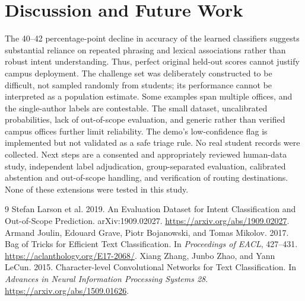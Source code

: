 \documentclass[sigconf,anonymous]{acmart}
\begin{document}
\section{Discussion and Future Work}
The 40--42 percentage-point decline in accuracy of the learned classifiers suggests substantial reliance on repeated phrasing and lexical associations rather than robust intent understanding. Thus, perfect original held-out scores cannot justify campus deployment. The challenge set was deliberately constructed to be difficult, not sampled randomly from students; its performance cannot be interpreted as a population estimate. Some examples span multiple offices, and the single-author labels are contestable. The small dataset, uncalibrated probabilities, lack of out-of-scope evaluation, and generic rather than verified campus offices further limit reliability. The demo's low-confidence flag is implemented but not validated as a safe triage rule. No real student records were collected. Next steps are a consented and appropriately reviewed human-data study, independent label adjudication, group-separated evaluation, calibrated abstention and out-of-scope handling, and verification of routing destinations. None of these extensions were tested in this study.
\begin{thebibliography}{9}
 Stefan Larson et al. 2019. An Evaluation Dataset for Intent Classification and Out-of-Scope Prediction. arXiv:1909.02027. \url{https://arxiv.org/abs/1909.02027}.
 Armand Joulin, Edouard Grave, Piotr Bojanowski, and Tomas Mikolov. 2017. Bag of Tricks for Efficient Text Classification. In \emph{Proceedings of EACL}, 427--431. \url{https://aclanthology.org/E17-2068/}.
 Xiang Zhang, Junbo Zhao, and Yann LeCun. 2015. Character-level Convolutional Networks for Text Classification. In \emph{Advances in Neural Information Processing Systems 28}. \url{https://arxiv.org/abs/1509.01626}.
\end{thebibliography}
\clearpage
\onecolumn
\end{document}
